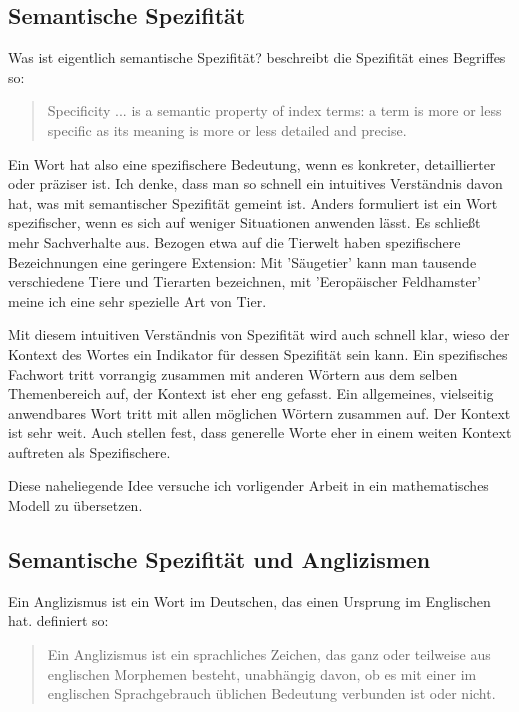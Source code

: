 \documentclass[11pt,numbers=noenddot]{scrartcl}
\begin{document}
\subsection*{Semantische Spezifität}
Was ist eigentlich semantische Spezifität? \citet[S. 11]{sparckjones1972} beschreibt die Spezifität eines Begriffes so:
\begin{quote}
  Specificity ... is a semantic property of index terms: a term is more or less specific as its meaning is more or less detailed and precise.
\end{quote}

Ein Wort hat also eine spezifischere Bedeutung, wenn es konkreter, detaillierter oder präziser ist. Ich denke, dass man so schnell ein intuitives Verständnis davon hat, was mit semantischer Spezifität gemeint ist. Anders formuliert ist ein Wort spezifischer, wenn es sich auf weniger Situationen anwenden lässt. Es schließt mehr Sachverhalte aus. Bezogen etwa auf die Tierwelt haben spezifischere Bezeichnungen eine geringere Extension: Mit 'Säugetier' kann man tausende verschiedene Tiere und Tierarten bezeichnen, mit 'Eeropäischer Feldhamster' meine ich eine sehr spezielle Art von Tier.

Mit diesem intuitiven Verständnis von Spezifität wird auch schnell klar, wieso der Kontext des Wortes ein Indikator für dessen Spezifität sein kann. Ein spezifisches Fachwort tritt vorrangig zusammen mit anderen Wörtern aus dem selben Themenbereich auf, der Kontext ist eher eng gefasst. Ein allgemeines, vielseitig anwendbares Wort tritt mit allen möglichen Wörtern zusammen auf. Der Kontext ist sehr weit. Auch \citet{weeds-weir-mccarthy} stellen fest, dass generelle Worte eher in einem weiten Kontext auftreten als Spezifischere.

Diese naheliegende Idee versuche ich vorligender Arbeit in ein mathematisches Modell zu übersetzen.

\subsection*{Semantische Spezifität und Anglizismen}

Ein Anglizismus ist ein Wort im Deutschen, das einen Ursprung im Englischen hat. \citet[S. 38]{schütte1996schöne} definiert so:

\begin{quote}
    Ein Anglizismus ist ein sprachliches Zeichen, das ganz oder teilweise aus englischen Morphemen besteht, unabhängig davon, ob es mit einer im englischen Sprachgebrauch üblichen Bedeutung verbunden ist oder nicht.
\end{quote}
\end{document}
